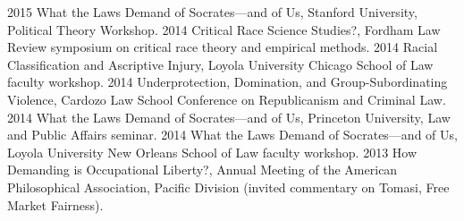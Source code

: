 \documentclass[letterpaper]{moderncv}
\begin{document}
\cvitem
{2015}
{What the Laws Demand of Socrates---and of Us, Stanford University, Political Theory Workshop.}
\vspace{1mm}
\cvitem
{2014}
{Critical Race Science Studies?, Fordham Law Review symposium on critical race theory and empirical methods.}
\vspace{1mm}
\cvitem
{2014}
{Racial Classification and Ascriptive Injury, Loyola University Chicago School of Law faculty workshop.}
\vspace{1mm}
\cvitem
{2014}
{Underprotection, Domination, and Group-Subordinating Violence, Cardozo Law School Conference on Republicanism and Criminal Law.}
\vspace{1mm}
\cvitem
{2014}
{What the Laws Demand of Socrates---and of Us, Princeton University, Law and Public Affairs seminar.}
\vspace{1mm}
\cvitem
{2014}
{What the Laws Demand of Socrates---and of Us, Loyola University New Orleans School of Law faculty workshop.}
\vspace{1mm}
\cvitem
{2013}
{How Demanding is Occupational Liberty?, Annual Meeting of the American Philosophical Association, Pacific Division (invited commentary on Tomasi, Free Market Fairness).}
\vspace{1mm}
\end{document}
